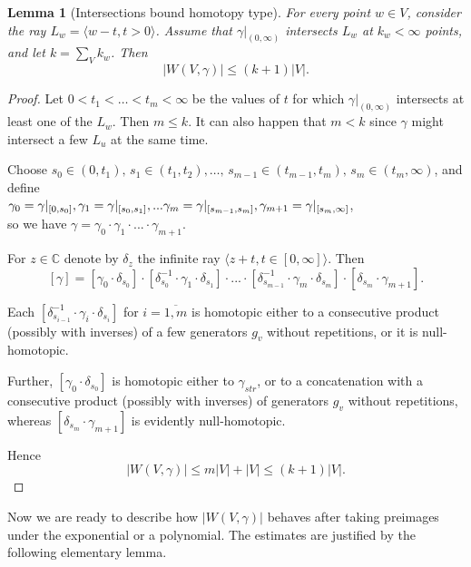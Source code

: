 \documentclass[10pt,reqno,a4paper]{amsart}
\numberwithin{figure}{section}
\numberwithin{equation}{section}
\newtheorem{lmm}[thm]{Lemma}
\newcommand{\abs}[1]{\lvert #1 \rvert}
\begin{document}
\begin{lmm}[Intersections bound homotopy type]
	\label{lmm:bounding_|W|}
	For every point $w \in V$, consider the ray $L_w=\langle w-t, t>0\rangle$. Assume that $\gamma|_{(0,\infty)}$ intersects $L_w$ at $k_w<\infty$ points, and let $k=\sum_{V} k_w$. Then $$\abs{W(V,\gamma)}\leq (k+1)\abs{V}.$$  
\end{lmm}
\begin{proof}
	Let $0<t_1<\dots<t_m<\infty$ be the values of $t$ for which $\gamma|_{(0,\infty)}$ intersects at least one of the $L_w$. Then $m\leq k $. It can also happen that $m<k$ since $\gamma$ might intersect a few $L_u$ at the same time.
	
	Choose $s_0 \in (0,t_1),\, s_1\in (t_1,t_2),\dots,\, s_{m-1}\in (t_{m-1},t_m),\, s_m\in (t_m,\infty)$, and define\\	
	$\gamma_0=\gamma|_{[0,s_0]},\\ \gamma_1=\gamma|_{[s_0,s_1]},\\...\\
	\gamma_m=\gamma|_{[s_{m-1},s_m]},\\\gamma_{m+1}=\gamma|_{[s_m,\infty]}$,\\	
	so we have $\gamma=\gamma_0\cdot\gamma_1\cdot...\cdot\gamma_{m+1}$.
	
	For $z\in\mathbb{C}$ denote by $\delta_z$ the infinite ray $\langle z+t,t\in [0,\infty]\rangle$. Then
	$$[\gamma]= [\gamma_0\cdot\delta_{s_0}]\cdot[\delta_{s_0}^{-1}\cdot\gamma_1\cdot\delta_{s_1}]\cdot ...\cdot[\delta_{s_{m-1}}^{-1}\cdot\gamma_m\cdot\delta_{s_m}]\cdot[\delta_{s_m}\cdot\gamma_{m+1}].$$
	
	Each $[\delta_{s_{i-1}}^{-1}\cdot\gamma_i\cdot\delta_{s_i}]$ for $i=\overline{1,m}$ is homotopic either to a consecutive product (possibly with inverses) of a few generators $g_v$ without repetitions, or it is null-homotopic.
	
	Further, $[\gamma_0\cdot\delta_{s_0}]$ is homotopic either to $\gamma_{str}$, or to a concatenation with a consecutive product (possibly with inverses) of generators $g_v$ without repetitions, whereas $[\delta_{s_m}\cdot\gamma_{m+1}]$ is evidently null-homotopic.
	
	Hence 
	$$\abs{W(V,\gamma)}\leq m\abs{V}+\abs{V}\leq (k+1)\abs{V}.$$
	
	
\end{proof}

Now we are ready to describe how $\abs{W(V,\gamma)}$ behaves after taking preimages under the exponential or a polynomial. The estimates are justified by the following elementary lemma.
\end{document}
